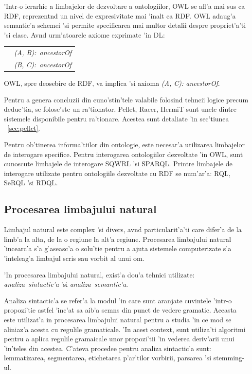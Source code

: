 \documentclass[12pt,a4paper,twoside]{report}
\begin{document}
'Intr-o ierarhie a limbajelor de dezvoltare a ontologiilor, OWL se afl'a mai sus ca RDF, reprezent\ia nd un nivel de expresivitate mai 'inalt ca RDF. OWL adaug'a semantic'a schemei 'si permite specificarea mai multor detalii despre propriet'a'ti 'si clase. Av\ia nd urm'atoarele axiome exprimate 'in DL:

\begin{tabular}{ll}
          &  {\it (A, B):\ ancestorOf}\\
          &  {\it (B, C):\ ancestorOf}\\
\end{tabular}

OWL, spre deosebire de RDF, va implica 'si axioma {\it (A, C): ancestorOf}. 

Pentru a genera concluzii din cuno'stin'tele valabile folosind tehncii logice precum deduc'tia, se folose'ste un ra'tionator. Pellet, Racer, HermiT sunt unele dintre sistemele disponibile pentru ra'tionare. Acestea sunt detaliate 'in sec'tiunea ~\ref{sec:pellet}.

Pentru ob'tinerea informa'tiilor din ontologie, este necesar'a utilizarea limbajelor de interogare specifice. Pentru interogarea ontologiilor dezvoltate 'in OWL, sunt cunoscute limbajele de interogare SQWRL 'si SPARQL. Printre limbajele de interogare utilizate pentru ontologiile dezvoltate cu RDF se num'ar'a: RQL, SeRQL 'si RDQL.



\subsection{Procesarea limbajului natural}

Limbajul natural este complex 'si divers, av\ia nd particularit'a'ti care difer'a de la limb'a la alta, de la o regiune la alt'a regiune. Procesarea limbajului natural 'incearc'a s'a g'aseasc'a o solu'tie pentru a ajuta sistemele computerizate s'a 'inteleag'a limbajul scris sau vorbit al unui om. 

'In procesarea limbajului natural, exist'a dou'a tehnici utilizate: {\it analiza\ sintactic'a} 'si {\it analiza\ semantic'a}.

Analiza sintactic'a se refer'a la modul 'in care sunt aranjate cuvintele 'intr-o propozi'tie astfel 'inc'at sa aib'a semns din punct de vedere gramatic. Aceasta este utilizat'a in procesarea limbajului natural pentru a studia 'in ce mod se aliniaz'a acesta cu regulile gramaticale. 'In acest context, sunt utiliza'ti algoritmi pentru a aplica regulile gramaicale unor propozi'tii 'in vederea deriv'arii unui 'in'teles din acestea. C'ateva procedee pentru analiza sintactic'a sunt: lemmatizarea, segmentarea, etichetarea p'ar'tilor vorbirii, parsarea 'si stemming-ul.
\end{document}
